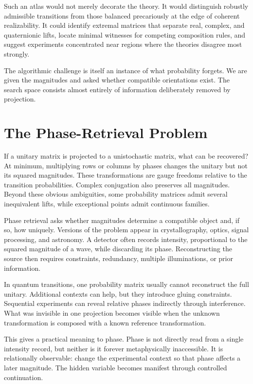 \documentclass[12pt,openany]{book}
\begin{document}
Such an atlas would not merely decorate the theory. It would distinguish robustly admissible transitions from those balanced precariously at the edge of coherent realizability. It could identify extremal matrices that separate real, complex, and quaternionic lifts, locate minimal witnesses for competing composition rules, and suggest experiments concentrated near regions where the theories disagree most strongly.

The algorithmic challenge is itself an instance of what probability forgets. We are given the magnitudes and asked whether compatible orientations exist. The search space consists almost entirely of information deliberately removed by projection.

\chapter{The Phase-Retrieval Problem}
If a unitary matrix is projected to a unistochastic matrix, what can be recovered? At minimum, multiplying rows or columns by phases changes the unitary but not its squared magnitudes. These transformations are gauge freedoms relative to the transition probabilities. Complex conjugation also preserves all magnitudes. Beyond these obvious ambiguities, some probability matrices admit several inequivalent lifts, while exceptional points admit continuous families.

Phase retrieval asks whether magnitudes determine a compatible object and, if so, how uniquely. Versions of the problem appear in crystallography, optics, signal processing, and astronomy. A detector often records intensity, proportional to the squared magnitude of a wave, while discarding its phase. Reconstructing the source then requires constraints, redundancy, multiple illuminations, or prior information.

In quantum transitions, one probability matrix usually cannot reconstruct the full unitary. Additional contexts can help, but they introduce gluing constraints. Sequential experiments can reveal relative phases indirectly through interference. What was invisible in one projection becomes visible when the unknown transformation is composed with a known reference transformation.

This gives a practical meaning to phase. Phase is not directly read from a single intensity record, but neither is it forever metaphysically inaccessible. It is relationally observable: change the experimental context so that phase affects a later magnitude. The hidden variable becomes manifest through controlled continuation.
\end{document}
